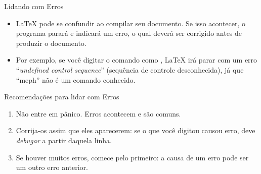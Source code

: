 \documentclass{beamer}
\begin{document}
\begin{frame}[fragile]{Lidando com Erros}
\begin{itemize}
  \item \LaTeX{} pode se confundir ao compilar seu documento. Se isso acontecer, o programa parará e indicará um erro, o qual deverá ser corrigido antes de produzir o documento.
  \item Por exemplo, se você digitar o comando  como , \LaTeX{} irá parar com um erro ``\emph{undefined control sequence}'' (sequência de controle desconhecida), já que ``meph'' não é um comando conhecido.
\end{itemize}
\begin{block}{Recomendações para lidar com Erros}
\begin{enumerate}
  \item Não entre em pânico. Erros  acontecem e são comuns.
  \item Corrija-os assim que eles aparecerem: se o que você digitou causou erro, deve \emph{debugar} a partir daquela linha.
  \item Se houver muitos erros, comece pelo primeiro: a causa de um erro pode ser um outro erro anterior.
\end{enumerate}
\end{block}
\end{frame}
\end{document}
